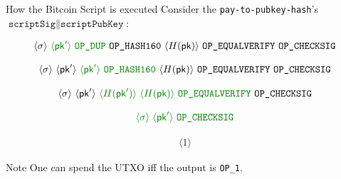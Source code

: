 \documentclass{zkdl-presentation-template}
\newcommand{\elem}[1]{\, \langle #1 \rangle \,}
\newcommand{\opcode}[1]{\, \texttt{#1} \,}
\begin{document}
    \begin{frame}{How the Bitcoin Script is executed}
        Consider the \texttt{pay-to-pubkey-hash}'s $\texttt{scriptSig} \parallel \texttt{scriptPubKey}$:
      \begin{empheqboxed}
        \scriptsize
        \begin{align*}
            \elem{\sigma} \textcolor{green!50!black}{\elem{\mathsf{pk}'}\opcode{\texttt{OP\_DUP}}} \opcode{\texttt{OP\_HASH160}} \elem{H(\mathsf{pk})} \opcode{OP\_EQUALVERIFY} 
            \opcode{OP\_CHECKSIG}
        \end{align*}
      \end{empheqboxed}
      \begin{empheqboxed}
        \scriptsize
        \begin{align*}
            \elem{\sigma} \elem{\mathsf{pk}'}\textcolor{green!50!black}{\elem{\mathsf{pk}'} \opcode{\texttt{OP\_HASH160}}} \elem{H(\mathsf{pk})} \opcode{OP\_EQUALVERIFY} 
            \opcode{OP\_CHECKSIG}
        \end{align*}
      \end{empheqboxed}
      \begin{empheqboxed}
        \scriptsize
        \begin{align*}
            \elem{\sigma} \elem{\mathsf{pk}'}\textcolor{green!50!black}{\elem{H(\mathsf{pk}')} \elem{H(\mathsf{pk})} \opcode{OP\_EQUALVERIFY}}
            \opcode{OP\_CHECKSIG}
        \end{align*}
      \end{empheqboxed}
      \begin{empheqboxed}
        \scriptsize
        \begin{align*}
            \textcolor{green!50!black}{\elem{\sigma} \elem{\mathsf{pk}'}
            \opcode{OP\_CHECKSIG}}
        \end{align*}
      \end{empheqboxed}
      \begin{empheqboxed}
        \scriptsize
        \begin{align*}
            \elem{1}
        \end{align*}
      \end{empheqboxed}

      \begin{block}{Note}
          One can spend the UTXO iff the output is \texttt{OP\_1}. 
      \end{block}
    \end{frame}
\end{document}
